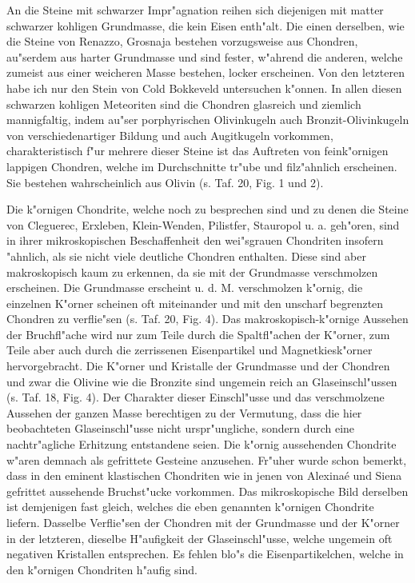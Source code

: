 \documentclass[a4paper, 11pt, oneside, polutonikogreek, german]{article}
\begin{document}
An die Steine mit schwarzer Impr"agnation reihen sich diejenigen mit matter schwarzer kohligen Grundmasse, die kein Eisen enth"alt. Die einen derselben, wie die Steine von Renazzo, Grosnaja bestehen vorzugsweise aus Chondren, au"serdem aus harter Grundmasse und sind fester, w"ahrend die anderen, welche zumeist aus einer weicheren Masse bestehen, locker erscheinen. Von den letzteren habe ich nur den Stein von Cold Bokkeveld untersuchen k"onnen. In allen diesen schwarzen kohligen Meteoriten sind die Chondren glasreich und ziemlich mannigfaltig, indem au"ser porphyrischen Olivinkugeln auch Bronzit-Olivinkugeln von verschiedenartiger Bildung und auch Augitkugeln vorkommen, charakteristisch f"ur mehrere dieser Steine ist das Auftreten von feink"ornigen lappigen Chondren, welche im Durchschnitte tr"ube und filz"ahnlich erscheinen. Sie bestehen wahrscheinlich aus Olivin (s. Taf. 20, Fig. 1 und 2).

Die k"ornigen Chondrite, welche noch zu besprechen sind und zu denen die Steine von Cleguerec, Erxleben, Klein-Wenden, Pilistfer, Stauropol u. a. geh"oren, sind in ihrer mikroskopischen Beschaffenheit den wei"sgrauen Chondriten insofern "ahnlich, als sie nicht viele deutliche Chondren enthalten. Diese sind aber makroskopisch kaum zu erkennen, da sie mit der Grundmasse verschmolzen erscheinen. Die Grundmasse erscheint u. d. M. verschmolzen k"ornig, die einzelnen K"orner scheinen oft miteinander und mit den unscharf begrenzten Chondren zu verflie"sen (s. Taf. 20, Fig. 4). Das makroskopisch-k"ornige Aussehen der Bruchfl"ache wird nur zum Teile durch die Spaltfl"achen der K"orner, zum Teile aber auch durch die zerrissenen Eisenpartikel und Magnetkiesk"orner hervorgebracht. Die K"orner und Kristalle der Grundmasse und der Chondren und zwar die Olivine wie die Bronzite sind ungemein reich an Glaseinschl"ussen (s. Taf. 18, Fig. 4). Der Charakter dieser Einschl"usse und das verschmolzene Aussehen der ganzen Masse berechtigen zu der Vermutung, dass die hier beobachteten Glaseinschl"usse nicht urspr"ungliche, sondern durch eine nachtr"agliche Erhitzung entstandene seien. Die k"ornig aussehenden Chondrite w"aren demnach als gefrittete Gesteine anzusehen. Fr"uher wurde schon bemerkt, dass in den eminent klastischen Chondriten wie in jenen von Alexinaé und Siena gefrittet aussehende Bruchst"ucke vorkommen. Das mikroskopische Bild derselben ist demjenigen fast gleich, welches die eben genannten k"ornigen Chondrite liefern. Dasselbe Verflie"sen der Chondren mit der Grundmasse und der K"orner in der letzteren, dieselbe H"aufigkeit der Glaseinschl"usse, welche ungemein oft negativen Kristallen entsprechen. Es fehlen blo"s die Eisenpartikelchen, welche in den k"ornigen Chondriten h"aufig sind.
\end{document}
